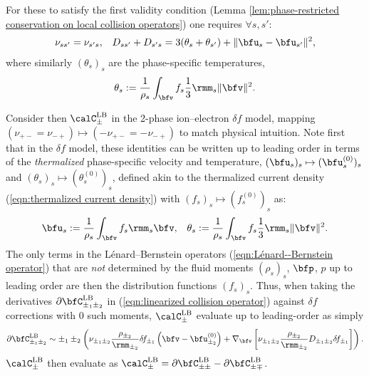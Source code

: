     For these to satisfy the first validity condition (Lemma \ref{lem:phase-restricted conservation on local collision operators}) one requires $\forall s, s'$:
    \begin{align}
        \nu_{ss'}          =  \nu_{s's},  &&
        D_{ss'} + D_{s's}  =  3(\theta_{s} + \theta_{s'}) + \|\bfu_{s} - \bfu_{s'}\|^{2},
    \end{align}
    where similarly $(\theta_{s})_{s}$ are the phase-specific temperatures,
    \begin{equation}
        \theta_{s}  :=  \frac{1}{\rho_{s}}\int_{\bfv}f_{s}\frac{1}{3}\rmm_{s}\|\bfv\|^{2}.
    \end{equation}
    
    Consider then $\calC_{\pm}^{\rm LB}$ in the 2-phase ion--electron $\delta\!f$ model, mapping $(\nu_{+-} = \nu_{-+})  \mapsto  (- \nu_{+-} = - \nu_{-+})$ to match physical intuition. Note first that in the $\delta\!f$ model, these identities can be written up to leading order in terms of the \emph{thermalized} phase-specific velocity and temperature, $(\bfu_{s})_{s}  \mapsto  (\bfu_{s}^{(0)})_{s}$ and $(\theta_{s})_{s}  \mapsto  (\theta_{s}^{(0)})_{s}$, defined akin to the thermalized current density (\ref{eqn:thermalized current density}) with $(f_{s})_{s}  \mapsto  (f_{s}^{(0)})_{s}$ as:
    \begin{align}
        \bfu_{s}    :=  \frac{1}{\rho_{s}}\int_{\bfv}f_{s}\rmm_{s}\bfv,  &&
        \theta_{s}  :=  \frac{1}{\rho_{s}}\int_{\bfv}f_{s}\frac{1}{3}\rmm_{s}\|\bfv\|^{2}.
    \end{align}
    The only terms in the Lénard--Bernstein operators (\ref{eqn:Lénard--Bernstein operator}) that are \emph{not} determined by the fluid moments $(\rho_{s})_{s}$, $\bfp$, $p$ up to leading order are then the distribution functions $(f_{s})_{s}$. Thus, when taking the derivatives $\partial\bfC_{\pm_{1}\pm_{2}}^{\rm LB}$ in (\ref{eqn:linearized collision operator}) against $\delta\!f$ corrections with 0 such moments, $\calC_{\pm}^{\rm LB}$ evaluate up to leading-order as simply
    \begin{equation}
        \partial\bfC_{\pm_{1}\pm_{2}}^{\rm LB}  \sim  \pm_{1}\pm_{2}\left(\nu_{\pm_{1}\pm_{2}}\frac{\rho_{\pm_{2}}}{\rmm_{\pm_{2}}}\delta\!f_{\pm_{1}}\left(\bfv - \bfu_{\pm_{2}}^{(0)}\right) + \nabla_{\bfv}\left[\nu_{\pm_{1}\pm_{2}}\frac{\rho_{\pm_{2}}}{\rmm_{\pm_{2}}}D_{\pm_{1}\pm_{2}}\delta\!f_{\pm_{1}}\right]\right).
    \end{equation}
    $\calC_{\pm}^{\rm LB}$ then evaluate as $\calC_{\pm}^{\rm LB}  =  \partial\bfC_{\pm\pm}^{\rm LB} - \partial\bfC_{\pm\mp}^{\rm LB}$.
    
